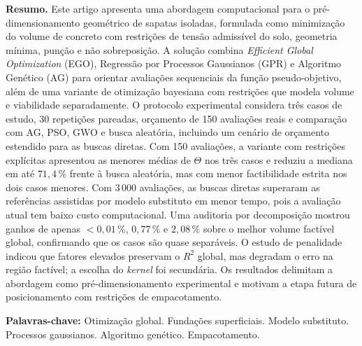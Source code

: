 \documentclass[10pt,a4paper,twocolumn]{article}
\begin{document}
{\begin{@twocolumnfalse}
\begin{list}{}{\setlength{\leftmargin}{1.2em}\setlength{\rightmargin}{1.2em}}
\item[]\small
\noindent \textbf{Resumo.}
Este artigo apresenta uma abordagem computacional para o pré-dimensionamento geométrico de sapatas isoladas, formulada como minimização do volume de concreto com restrições de tensão admissível do solo, geometria mínima, punção e não sobreposição. A solução combina \textit{Efficient Global Optimization} (EGO), Regressão por Processos Gaussianos (GPR) e Algoritmo Genético (AG) para orientar avaliações sequenciais da função pseudo-objetivo, além de uma variante de otimização bayesiana com restrições que modela volume e viabilidade separadamente. O protocolo experimental considera três casos de estudo, 30 repetições pareadas, orçamento de 150 avaliações reais e comparação com AG, PSO, GWO e busca aleatória, incluindo um cenário de orçamento estendido para as buscas diretas. Com 150 avaliações, a variante com restrições explícitas apresentou as menores médias de $\Theta$ nos três casos e reduziu a mediana em até $71{,}4\,\%$ frente à busca aleatória, mas com menor factibilidade estrita nos dois casos menores. Com $3\,000$ avaliações, as buscas diretas superaram as referências assistidas por modelo substituto em menor tempo, pois a avaliação atual tem baixo custo computacional. Uma auditoria por decomposição mostrou ganhos de apenas $<0{,}01\,\%$, $0{,}77\,\%$ e $2{,}08\,\%$ sobre o melhor volume factível global, confirmando que os casos são quase separáveis. O estudo de penalidade indicou que fatores elevados preservam o $R^2$ global, mas degradam o erro na região factível; a escolha do \textit{kernel} foi secundária. Os resultados delimitam a abordagem como pré-dimensionamento experimental e motivam a etapa futura de posicionamento com restrições de empacotamento.

\noindent \textbf{Palavras-chave:} Otimização global. Fundações superficiais. Modelo substituto. Processos gaussianos. Algoritmo genético. Empacotamento.

\vspace{0.3cm}


\end{list}
\end{@twocolumnfalse}}
\end{document}
